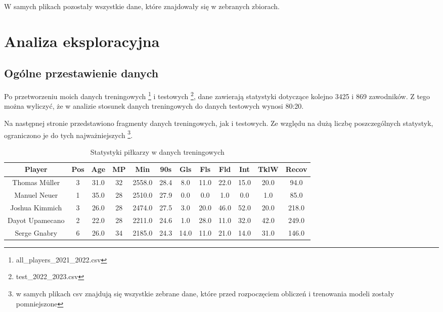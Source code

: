 \documentclass{article}
\begin{document}
W samych plikach pozostały wszystkie dane, które znajdowały się w zebranych zbiorach.

\section{Analiza eksploracyjna}

\subsection{Ogólne przestawienie danych}

Po przetworzeniu moich danych treningowych \footnote{all\_players\_2021\_2022.csv} i testowych \footnote{test\_2022\_2023.csv}, dane zawierają statystyki dotyczące kolejno 3425 i 869 zawodników. Z tego można wyliczyć, że w analizie stosunek danych treningowych do danych testowych wynosi 80:20. 

Na następnej stronie przedstawiono fragmenty danych treningowych, jak i testowych. Ze względu na dużą liczbę poszczególnych statystyk, ograniczono je do tych najważniejszych \footnote{w samych plikach csv znajdują się wszystkie zebrane dane, które przed rozpoczęciem obliczeń i trenowania modeli zostały pomniejszone}.

\begin{table}[H]
    \centering
    \begin{tabular}{|c|c|c|c|c|c|c|c|c|c|c|c|}
    \hline
    Player & Pos & Age & MP & Min & 90s & Gls & Fls & Fld & Int & TklW & Recov \\
    \hline
    Thomas Müller & 3 & 31.0 & 32 & 2558.0 & 28.4 & 8.0 & 11.0 & 22.0 & 15.0 & 20.0 & 94.0 \\ \hline
    Manuel Neuer & 1 & 35.0 & 28 & 2510.0 & 27.9 & 0.0 & 0.0 & 1.0 & 0.0 & 1.0 & 85.0 \\ \hline
    Joshua Kimmich & 3 & 26.0 & 28 & 2474.0 & 27.5 & 3.0 & 20.0 & 46.0 & 52.0 & 20.0 & 218.0 \\ \hline
    Dayot Upamecano & 2 & 22.0 & 28 & 2211.0 & 24.6 & 1.0 & 28.0 & 11.0 & 32.0 & 42.0 & 249.0 \\ \hline
    Serge Gnabry & 6 & 26.0 & 34 & 2185.0 & 24.3 & 14.0 & 11.0 & 21.0 & 14.0 & 31.0 & 146.0 \\ 
    \hline
    \end{tabular}
    \caption{Statystyki piłkarzy w danych treningowych}
\end{table}
\end{document}

